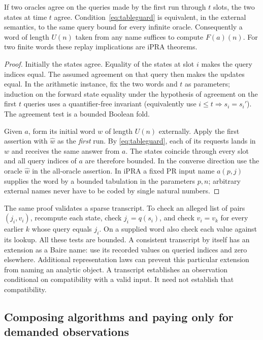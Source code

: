 \begin{theorem}
If two oracles agree on the queries made by the first run through $t$ slots,
the two states at time $t$ agree. Condition~\eqref{eq:tableguard} is equivalent,
in the external semantics, to the same query bound for every infinite oracle.
Consequently a word of length $U(n)$ taken from any name suffices to compute
$F(a)(n)$. For two finite words these replay implications are iPRA theorems.
\end{theorem}
\begin{proof}
Initially the states agree. Equality of the states at slot $i$ makes the
query indices equal. The assumed agreement on that query then makes the
updates equal. In the arithmetic instance, fix the two words and $t$ as
parameters; induction on the forward state equality under the hypothesis
of agreement on the first $t$ queries uses a quantifier-free invariant
(equivalently use $i\le t\Rightarrow s_i=s_i'$). The agreement test is a
bounded Boolean fold.

Given $a$, form its initial word $w$ of length $U(n)$ externally. Apply
the first assertion with $\widehat w$ as the \emph{first} run. By
\eqref{eq:tableguard}, each of its requests lands in $w$ and receives
the same answer from $a$. The states coincide through every slot and all
query indices of $a$ are therefore bounded. In the converse direction use
the oracle $\widehat w$ in the all-oracle assertion. In iPRA a fixed PR
input name $a(p,j)$ supplies the word by a bounded tabulation in the
parameters $p,n$; arbitrary external names never have to be coded by single
natural numbers.
\end{proof}

The same proof validates a sparse transcript. To check an alleged list of
pairs $(j_i,v_i)$, recompute each state, check $j_i=q(s_i)$, and check
$v_i=v_k$ for every earlier $k$ whose query equals $j_i$. On a supplied
word also check each value against its lookup. All these tests are bounded.
A consistent transcript by itself has an extension as a Baire name: use its
recorded values on queried indices and zero elsewhere. Additional
representation laws can prevent this particular extension from naming an
analytic object. A transcript establishes an observation conditional on
compatibility with a valid input. It need not establish that compatibility.

\subsection{Composing algorithms and paying only for demanded observations}

